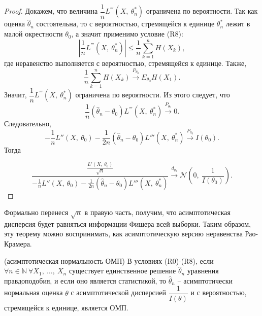\begin{proof}
    Докажем, что величина $\displaystyle \dfrac{1}{n} L^{'''}\left( X,\ \theta _{n}^{*}\right)$ ограничена по вероятности. Так как оценка $\displaystyle \hat{\theta }_{n}$ состоятельна, то с вероятностью, стремящейся к единице $\displaystyle \theta _{n}^{*}$ лежит в малой окрестности $\displaystyle \theta _{0}$, а значит применимо условие (R8):
    \begin{equation*}
        \left| \dfrac{1}{n} L^{'''}\left( X,\ \theta _{n}^{*}\right)\right| \leq \dfrac{1}{n}\sum _{k=1}^{n} H( X_{k}) ,
    \end{equation*}
    где неравенство выполняется с вероятностью, стремящейся к единице. Также,
    \begin{equation*}
        \dfrac{1}{n}\sum _{k=1}^{n} H( X_{k})\xrightarrow{P_{\theta _{0}}} E_{\theta _{0}} H( X_{1}) .
    \end{equation*}
    Значит, $\displaystyle \dfrac{1}{n} L^{'''}\left( X,\ \theta _{n}^{*}\right)$ ограничена по вероятности. Из этого следует, что
    \begin{equation*}
        \frac{1}{n}(\hat{\theta }_{n} -\theta _{0}) L^{'''}\left( X,\ \theta _{n}^{*}\right)\xrightarrow{P_{\theta _{0}}} 0.
    \end{equation*}
    Следовательно,
    \begin{equation*}
        -\frac{1}{n} L''( X,\ \theta _{0}) -\frac{1}{2n}(\hat{\theta }_{n} -\theta _{0}) L'''\left( X,\ \theta _{n}^{*}\right)\xrightarrow{P_{\theta _{0}}} I( \theta _{0}) .
    \end{equation*}
    Тогда
    
    \begin{equation*}
        \dfrac{\frac{L'( X,\ \theta _{0})}{\sqrt{n}}}{-\frac{1}{n} L''( X,\ \theta _{0}) -\frac{1}{2n}(\hat{\theta }_{n} -\theta _{0}) L'''\left( X,\ \theta _{n}^{*}\right)}\xrightarrow{d_{\theta _{0}}}\mathcal{N}\left( 0,\ \dfrac{1}{I( \theta _{0})}\right) .
    \end{equation*}
\end{proof}
\begin{note}
    Формально перенеся $\displaystyle \sqrt{n}$ в правую часть, получим, что асимптотическая дисперсия будет равняться информации Фишера всей выборки. Таким образом, эту теорему можно воспринимать, как асимптотическую версию неравенства Рао-Крамера.
\end{note}
\begin{corollary}
    (асимптотическая нормальность ОМП) В условиях (R0)-(R8), если $\displaystyle \forall n\in \mathbb{N} \ \forall X_{1} ,\ \dotsc ,\ X_{n}$ существует единственное решение $\displaystyle \hat{\theta }_{n}$ уравнения правдоподобия, и если оно является статистикой, то $\displaystyle \hat{\theta }_{n}$ -- асимптотически нормальная оценка $\displaystyle \theta $ с асимптотической дисперсией $\displaystyle \dfrac{1}{I( \theta )}$ и с вероятностью, стремящейся к единице, является ОМП. 
\end{corollary}
